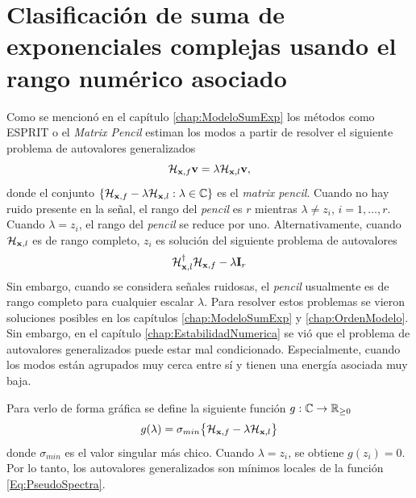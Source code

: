 \chapter{Clasificación de suma de exponenciales complejas usando el rango numérico asociado} \label{chap:RangoNumerico}

	
		Como se mencionó en el capítulo \eqref{chap:ModeloSumExp} los métodos como ESPRIT o el \emph{Matrix Pencil} estiman los modos a partir de resolver el siguiente problema de autovalores generalizados
		\begin{equation}
			\mathcal{H}_{\mathbf{x},f}\mathbf{v} = \lambda\mathcal{H}_{\mathbf{x},l}\mathbf{v},
			\label{Eq:GEP}
		\end{equation}
		donde el conjunto $\{\mathcal{H}_{\mathbf{x},f}-\lambda\mathcal{H}_{\mathbf{x},l}: \lambda\in\mathbb{C}\}$ es el \emph{matrix pencil}. Cuando no hay ruido presente en la señal, el rango del \emph{pencil} es $r$ mientras $\lambda\neq z_i$, $i=1,\ldots, r$. Cuando $\lambda = z_i$, el rango del \emph{pencil} se reduce por uno. Alternativamente, cuando $\mathcal{H}_{\mathbf{x},l}$ es de rango completo, $z_i$ es solución del siguiente problema de autovalores
		\begin{equation}
			\mathcal{H}_{\mathbf{x},l}^\dagger\mathcal{H}_{\mathbf{x},f}-\lambda\mathbf{I}_r
			\label{Eq:AVA}
		\end{equation}
		Sin embargo, cuando se considera señales ruidosas, el \emph{pencil} usualmente es de rango completo para cualquier escalar $\lambda$. Para resolver estos problemas se vieron soluciones posibles en los capítulos \eqref{chap:ModeloSumExp} y \eqref{chap:OrdenModelo}. Sin embargo, en el capítulo \eqref{chap:EstabilidadNumerica} se vió que el problema de autovalores generalizados puede estar mal condicionado. Especialmente, cuando los modos están agrupados muy cerca entre sí y tienen una energía asociada muy baja.
		
		Para verlo de forma gráfica se define la siguiente función $g:\mathbb{C}\to\mathbb{R}_{\ge0}$
		\begin{equation}
			g(\lambda) = \sigma_{min}\big\{\mathcal{H}_{\mathbf{x},f}-\lambda\mathcal{H}_{\mathbf{x},l}\big\}
			\label{Eq:PseudoSpectra}
		\end{equation}
		donde $\sigma_{min}$ es el valor singular más chico. Cuando $\lambda=z_i$, se obtiene $g(z_i)=0$. Por lo tanto, los autovalores generalizados son mínimos locales de la función \eqref{Eq:PseudoSpectra}.
		
